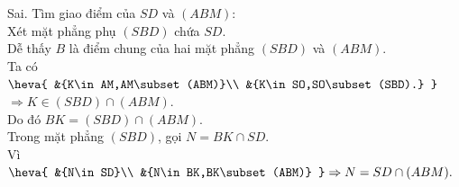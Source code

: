 \begin{ex}
{\begin{itemchoice}
\begin{center}
\begin{tikzpicture}[x=0.75pt,y=0.75pt,yscale=-1,xscale=1]
				
			\end{tikzpicture}
		\end{center}
			\itemch Sai. Tìm giao điểm của $SD$ và $ (ABM)$:\\
			Xét mặt phẳng phụ $ (SBD)$ chứa $SD$.\\
			Dễ thấy $B$ là điểm chung của hai mặt phẳng $(SBD)$ và $ (ABM)$.\\
			Ta có $\heva{
					&{K\in AM,AM\subset (ABM)}\\
					&{K\in SO,SO\subset (SBD).}
			}$ \\
			$\Rightarrow K\in (SBD)\cap (ABM)$.\\
			Do đó $ BK=(SBD)\cap (ABM)$.\\
			Trong mặt phẳng $ (SBD)$, gọi $ N=BK\cap SD$.\\
		Vì $\heva{
					&{N\in SD}\\
					&{N\in BK,BK\subset (ABM)}
	           }\Rightarrow N=SD\cap (ABM).$\\
		\end{itemchoice}
	}
\end{ex}

